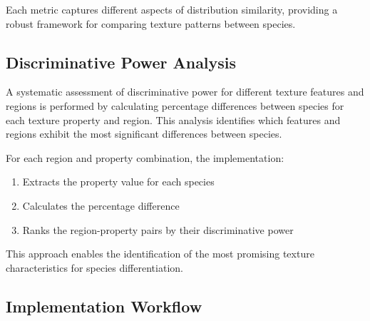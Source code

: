 \documentclass[a4paper,12pt]{report}
\begin{document}
Each metric captures different aspects of distribution similarity, providing a robust framework for comparing texture patterns between species.

\subsection{Discriminative Power Analysis}

A systematic assessment of discriminative power for different texture features and regions is performed by calculating percentage differences between species for each texture property and region. This analysis identifies which features and regions exhibit the most significant differences between species.

For each region and property combination, the implementation:
\begin{enumerate}
    \item Extracts the property value for each species
    \item Calculates the percentage difference
    \item Ranks the region-property pairs by their discriminative power
\end{enumerate}

This approach enables the identification of the most promising texture characteristics for species differentiation.





\subsection{Implementation Workflow}
\end{document}
